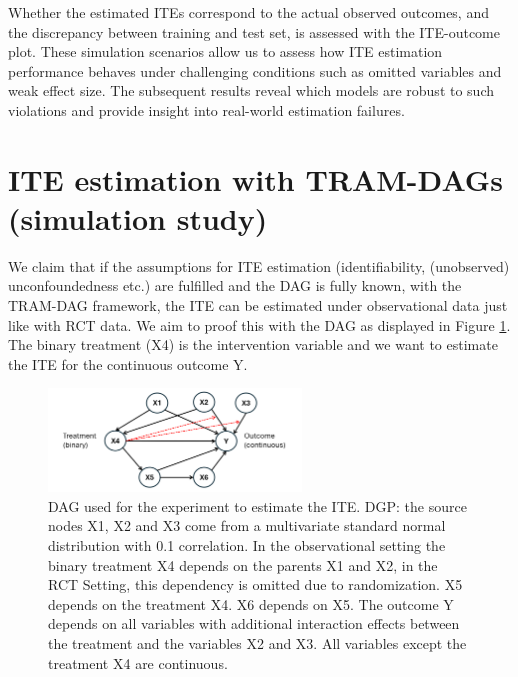 Whether the estimated ITEs correspond to the actual observed outcomes, and the discrepancy between training and test set, is assessed with the ITE-outcome plot.
These simulation scenarios allow us to assess how ITE estimation performance behaves under challenging conditions such as omitted variables and weak effect size. The subsequent results reveal which models are robust to such violations and provide insight into real-world estimation failures.






\section{ITE estimation with TRAM-DAGs (simulation study)}



We claim that if the assumptions for ITE estimation (identifiability, (unobserved) unconfoundedness etc.) are fulfilled and the DAG is fully known, with the TRAM-DAG framework, the ITE can be estimated under observational data just like with RCT data. We aim to proof this with the DAG as displayed in Figure \ref{fig:ite_dag_observational}. The binary treatment (X4) is the intervention variable and we want to estimate the ITE for the continuous outcome Y. 


\begin{figure}[H]
\centering
\includegraphics[width=0.6\textwidth]{img/dag_ITE_observational.png}
\caption{DAG used for the experiment to estimate the ITE. DGP: the source nodes X1, X2 and X3 come from a multivariate standard normal distribution with 0.1 correlation. In the observational setting the binary treatment X4 depends on the parents X1 and X2, in the RCT Setting, this dependency is omitted due to randomization. X5 depends on the treatment X4. X6 depends on X5. The outcome Y depends on all variables with additional interaction effects between the treatment and the variables X2 and X3. All variables except the treatment X4 are continuous.}
\label{fig:ite_dag_observational}
\end{figure}

